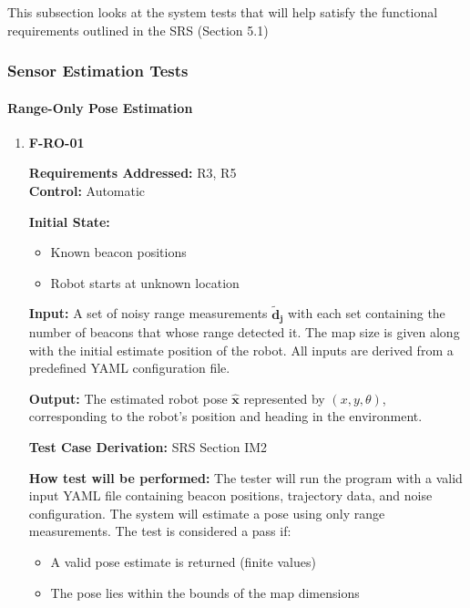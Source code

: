\documentclass[12pt, titlepage]{article}
\begin{document}
This subsection looks at the system tests that will help satisfy the functional requirements outlined in the SRS (Section 5.1)

\subsubsection{Sensor Estimation Tests}


		
\paragraph{Range-Only Pose Estimation}

\begin{enumerate}

\item{\textbf{F-RO-01}}

\textbf{Requirements Addressed:} R3, R5\\
\textbf{Control:} Automatic
					
\textbf{Initial State: }
\begin{itemize}
  \item Known beacon positions
  \item Robot starts at unknown location
\end{itemize}
					
\textbf{Input:} A set of noisy range measurements $\mathbf{\tilde{d}_j}$ with each set containing the number of beacons that whose range detected it. The map size is given along with the initial estimate position of the robot. All inputs are derived from a predefined YAML configuration file.

\textbf{Output:} The estimated robot pose $\mathbf{\hat{x}}$ represented by $(x,y,\theta)$, corresponding to the robot's position and heading in the environment.
 

\textbf{Test Case Derivation:} SRS Section IM2
					
\textbf{How test will be performed:} The tester will run the program with a valid input YAML file containing beacon positions, trajectory data, and noise configuration. The system will estimate a pose using only range measurements. The test is considered a pass if:
\begin{itemize}
  \item A valid pose estimate is returned (finite values)
  \item The pose lies within the bounds of the map dimensions
\end{itemize}

\end{enumerate}
\end{document}
